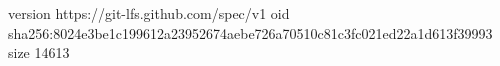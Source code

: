 version https://git-lfs.github.com/spec/v1
oid sha256:8024e3be1c199612a23952674aebe726a70510c81c3fc021ed22a1d613f39993
size 14613
